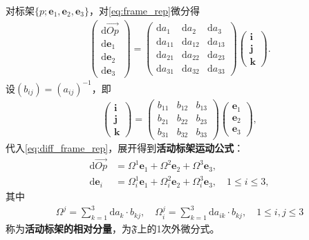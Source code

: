 \documentclass[../../main.tex]{subfiles}%
\begin{document}
\begin{definition}
对标架$\{p;\boldsymbol{e}_1,\boldsymbol{e}_2,\boldsymbol{e}_3\}$，对\eqref{eq:frame_rep}微分得
\begin{align}
\begin{pmatrix}
\mathrm{d}\overrightarrow{Op}\\
\mathrm{d}\boldsymbol{e}_1\\
\mathrm{d}\boldsymbol{e}_2\\
\mathrm{d}\boldsymbol{e}_3
\end{pmatrix}
=
\begin{pmatrix}
\mathrm{d}a_1 & \mathrm{d}a_2 & \mathrm{d}a_3\\
\mathrm{d}a_{11} & \mathrm{d}a_{12} & \mathrm{d}a_{13}\\
\mathrm{d}a_{21} & \mathrm{d}a_{22} & \mathrm{d}a_{23}\\
\mathrm{d}a_{31} & \mathrm{d}a_{32} & \mathrm{d}a_{33}
\end{pmatrix}
\begin{pmatrix}
\boldsymbol{i}\\
\boldsymbol{j}\\
\boldsymbol{k}
\end{pmatrix}.
\label{eq:diff_frame_rep}
\end{align}
设$(b_{ij})=(a_{ij})^{-1}$，即
\begin{align}
\begin{pmatrix}
\boldsymbol{i}\\
\boldsymbol{j}\\
\boldsymbol{k}
\end{pmatrix}
=
\begin{pmatrix}
b_{11} & b_{12} & b_{13}\\
b_{21} & b_{22} & b_{23}\\
b_{31} & b_{32} & b_{33}
\end{pmatrix}
\begin{pmatrix}
\boldsymbol{e}_1\\
\boldsymbol{e}_2\\
\boldsymbol{e}_3
\end{pmatrix},
\label{eq:dual_basis}
\end{align}
代入\eqref{eq:diff_frame_rep}，展开得到\textbf{活动标架运动公式}：
\begin{align}
\mathrm{d}\overrightarrow{Op}&=\Omega^1\boldsymbol{e}_1+\Omega^2\boldsymbol{e}_2+\Omega^3\boldsymbol{e}_3,\nonumber\\
\mathrm{d}\boldsymbol{e}_i&=\Omega_i^1\boldsymbol{e}_1+\Omega_i^2\boldsymbol{e}_2+\Omega_i^3\boldsymbol{e}_3,\quad 1\leqslant i\leqslant3,
\label{eq:motion_formula}
\end{align}
其中
\begin{align}
\Omega^j=\sum\limits_{k=1}^3\mathrm{d}a_k\cdot b_{kj},\quad \Omega_i^j=\sum\limits_{k=1}^3\mathrm{d}a_{ik}\cdot b_{kj},\quad 1\leqslant i,j\leqslant3
\label{eq:rel_comp_def}
\end{align}
称为\textbf{活动标架的相对分量}，为$\mathfrak{F}$上的1次外微分式。


\end{definition}
\end{document}
